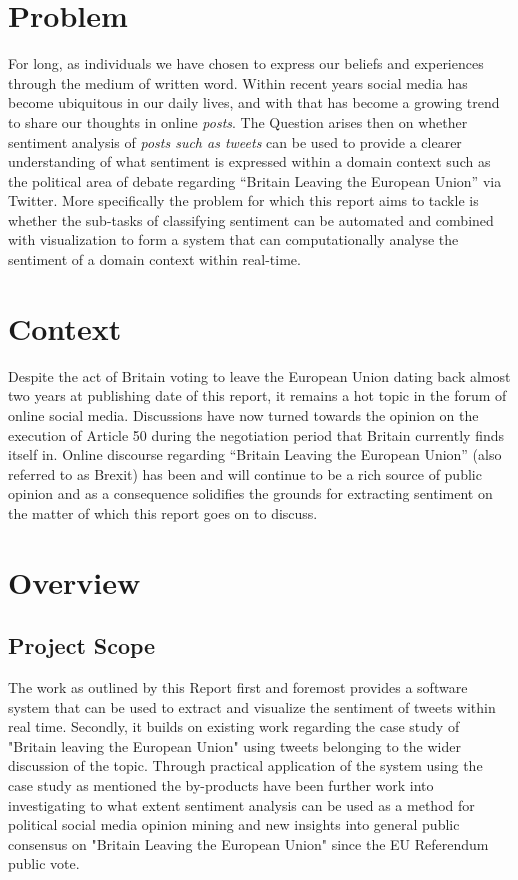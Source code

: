 \documentclass[11pt]{report}
\begin{document}
  
\section{Problem}
For long, as individuals we have chosen to express our beliefs and experiences through the medium of written word. Within recent years social media has become ubiquitous in our daily lives, and with that has become a growing trend to share our thoughts in online \textit{posts}. The Question arises then on whether sentiment analysis of \textit{posts such as tweets} can be used to provide a clearer understanding of what sentiment is expressed within a domain context such as the political area of debate regarding  ``Britain Leaving the European Union'' via Twitter. More specifically the problem for which this report aims to tackle is whether the sub-tasks of classifying sentiment can be automated and combined with visualization to form a system that can computationally analyse the sentiment of a domain context within real-time.
 
\section{Context}
Despite the act of Britain voting to leave the European Union dating back almost two years at publishing date of this report, it remains a hot topic in the forum of online social media. Discussions have now turned towards the opinion on the execution of Article 50 during the negotiation period that Britain currently finds itself in. Online discourse regarding ``Britain Leaving the European Union'' (also referred to as Brexit) has been and will continue to be a rich source of public opinion and as a consequence solidifies the grounds for extracting sentiment on the matter of which this report goes on to discuss.

\clearpage
\section{Overview}
\subsection*{Project Scope}
The work as outlined by this Report first and foremost provides a software system that can be used to extract and visualize the sentiment of tweets within real time. Secondly, it builds on existing work regarding the case study of "Britain leaving the European Union" using tweets belonging to the wider discussion of the topic. Through practical application of the system using the case study as mentioned the by-products have been further work into investigating to what extent sentiment analysis can be used as a method for political social media opinion mining and new insights into general public consensus on "Britain Leaving the European Union" since the EU Referendum public vote.
\end{document}
